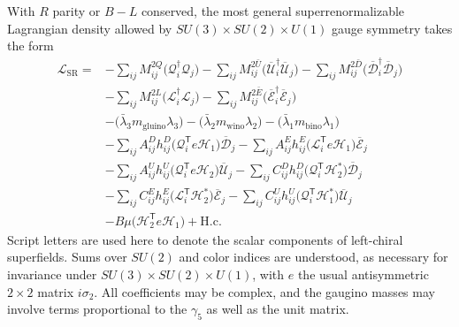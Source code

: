 With \(R\) parity or \(B-L\) conserved, the most general
superrenormalizable Lagrangian density allowed by
\(SU(3)\times SU(2)\times U(1)\) gauge symmetry takes
the form
\begin{equation}
  \begin{aligned}
  \mathcal{L}_{\mathrm{SR}}={}&
  -\sum_{ij}M_{ij}^{2Q}
    \bigl(\mathcal{Q}_i^\dagger\mathcal{Q}_j\bigr)
  -\sum_{ij}M_{ij}^{2\bar U}
    \bigl(\overline{\mathcal{U}}_i^\dagger
          \overline{\mathcal{U}}_j\bigr)
  -\sum_{ij}M_{ij}^{2\bar D}
    \bigl(\overline{\mathcal{D}}_i^\dagger
          \overline{\mathcal{D}}_j\bigr)
  \\
  &-\sum_{ij}M_{ij}^{2L}
    \bigl(\mathcal{L}_i^\dagger\mathcal{L}_j\bigr)
  -\sum_{ij}M_{ij}^{2\bar E}
    \bigl(\overline{\mathcal{E}}_i^\dagger
          \overline{\mathcal{E}}_j\bigr)
  \\
  &-\bigl(\bar{\lambda}_3m_{\mathrm{gluino}}\lambda_3\bigr)
  -\bigl(\bar{\lambda}_2m_{\mathrm{wino}}\lambda_2\bigr)
  -\bigl(\bar{\lambda}_1m_{\mathrm{bino}}\lambda_1\bigr)
  \\
  &-\sum_{ij}A_{ij}^{D}h_{ij}^{D}
    \bigl(\mathcal{Q}_i^{\mathsf T}e\mathcal{H}_1\bigr)
    \overline{\mathcal{D}}_j
  -\sum_{ij}A_{ij}^{E}h_{ij}^{E}
    \bigl(\mathcal{L}_i^{\mathsf T}e\mathcal{H}_1\bigr)
    \overline{\mathcal{E}}_j
  \\
  &-\sum_{ij}A_{ij}^{U}h_{ij}^{U}
    \bigl(\mathcal{Q}_i^{\mathsf T}e\mathcal{H}_2\bigr)
    \overline{\mathcal{U}}_j
  -\sum_{ij}C_{ij}^{D}h_{ij}^{D}
    \bigl(\mathcal{Q}_i^{\mathsf T}\mathcal{H}_2^*\bigr)
    \overline{\mathcal{D}}_j
  \\
  &-\sum_{ij}C_{ij}^{E}h_{ij}^{E}
    \bigl(\mathcal{L}_i^{\mathsf T}\mathcal{H}_2^*\bigr)
    \overline{\mathcal{E}}_j
  -\sum_{ij}C_{ij}^{U}h_{ij}^{U}
    \bigl(\mathcal{Q}_i^{\mathsf T}\mathcal{H}_1^*\bigr)
    \overline{\mathcal{U}}_j
  \\
  &-B\mu\bigl(\mathcal{H}_2^{\mathsf T}e\mathcal{H}_1\bigr)
  +\mathrm{H.c.}
  \end{aligned}
  \tag{28.4.1}\label{eq:28.4.1}
\end{equation}
Script letters are used here to denote the scalar components of
left-chiral superfields. Sums over \(SU(2)\) and color indices are
understood, as necessary for invariance under
\(SU(3)\times SU(2)\times U(1)\), with \(e\) the usual
antisymmetric \(2\times2\) matrix \(i\sigma_2\). All coefficients
may be complex, and the gaugino masses may involve terms proportional to
the \(\gamma_5\) as well as the unit matrix.

